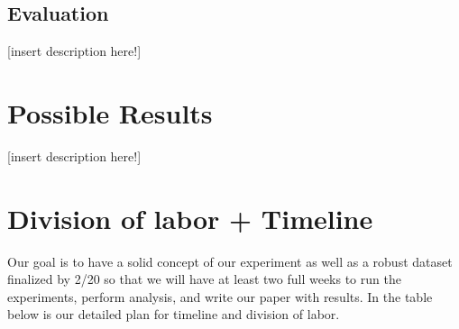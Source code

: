 \documentclass[11pt,a4paper]{article}
\begin{document}
\subsection{Evaluation}


\vspace{5mm}
[insert description here!]

\vspace{15mm}






\section{Possible Results}
\vspace{5mm}
[insert description here!]

\vspace{15mm}





\section{Division of labor + Timeline}
Our goal is to have a solid concept of our experiment as well as a robust dataset finalized by 2/20 so that we will have at least two full weeks to run the experiments, perform analysis, and write our paper with results. In the table below is our detailed plan for timeline and division of labor.

\clearpage
\clearpage


\end{document}
